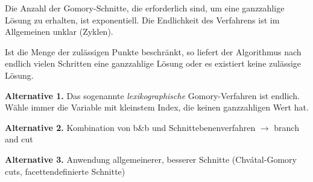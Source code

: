 \begin{exmp}
\end{exmp}

\begin{rmrk*}
  Die Anzahl der Gomory-Schnitte, die erforderlich sind, um eine ganzzahlige
  Lösung zu erhalten, ist exponentiell. Die Endlichkeit des Verfahrens ist im
  Allgemeinen unklar (Zyklen).

  Ist die Menge der zulässigen Punkte beschränkt, so liefert der Algorithmus
  nach endlich vielen Schritten eine ganzzahlige Lösung oder es existiert keine
  zulässige Lösung.
\end{rmrk*}

\textbf{Alternative 1.} Das sogenannte \emph{lexikographische} Gomory-Verfahren
ist endlich. Wähle immer die Variable mit kleinstem Index, die keinen
ganzzahligen Wert hat.

\textbf{Alternative 2.} Kombination von b\&b und
Schnittebenenverfahren $\rightarrow$ branch and cut

\textbf{Alternative 3.} Anwendung allgemeinerer, besserer Schnitte
(Chvátal-Gomory cuts, facettendefinierte Schnitte)

